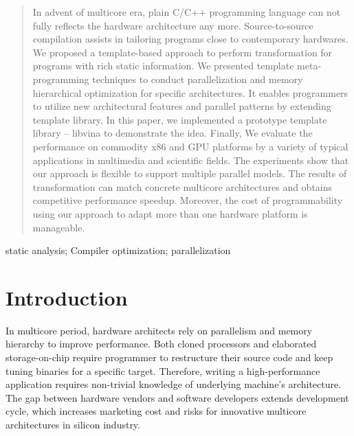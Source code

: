 \documentclass[10pt, conference, compsocconf]{IEEEtran}
\begin{document}
\begin{abstract}
In advent of multicore era, plain C/C++ programming language can not
fully reflects the hardware architecture any more. Source-to-source
compilation assists in tailoring programs close to contemporary
hardwares. We proposed a template-based approach to perform 
transformation for programs with rich static information. We presented
template meta-programming techniques to conduct parallelization and memory
hierarchical optimization for specific architectures. It enables
programmers to utilize new architectural
features and parallel patterns by extending template library. 
In this paper, we implemented a prototype template library -- libvina
to demonstrate the idea. Finally, We evaluate the performance on
commodity x86 and GPU platforms by a variety of typical applications
in multimedia and scientific fields. The experiments show that our
approach is flexible to support multiple parallel models. The
results of transformation can match concrete multicore architectures and obtains
competitive performance speedup. Moreover, the cost of programmability using our
approach to adapt more than one hardware platform is manageable.
\end{abstract}

\begin{IEEEkeywords}
static analysis; Compiler optimization; parallelization
\end{IEEEkeywords}


%
\IEEEpeerreviewmaketitle

\section{Introduction}
In multicore period, hardware architects rely on parallelism and memory hierarchy to improve performance. Both cloned processors and elaborated storage-on-chip require programmer to restructure their source code and keep tuning binaries for a specific target. Therefore, writing a high-performance application requires non-trivial knowledge of underlying machine's architecture. The gap between hardware vendors and software developers extends development cycle, which increases marketing cost and risks for innovative multicore architectures in silicon industry.
\end{document}
